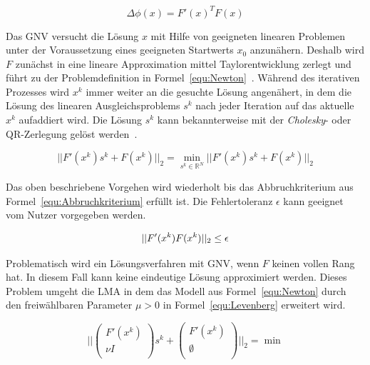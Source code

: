 \begin{equation}
\label{equ:GradPhi}
\Delta\phi(x)=F'(x)^TF(x)
\end{equation}

Das GNV versucht die Lösung $x$ mit Hilfe von geeigneten linearen Problemen unter der Voraussetzung eines geeigneten Startwerts $x_0$ anzunähern. Deshalb wird $F$ zunächst in eine lineare Approximation mittel Taylorentwicklung zerlegt und führt zu der Problemdefinition in Formel~\ref{equ:Newton}~\cite{LevMarquardt}. Während des iterativen Prozesses wird $x^k$ immer weiter an die gesuchte Lösung angenähert, in dem die Lösung des linearen Ausgleichsproblems $s^k$ nach jeder Iteration auf das aktuelle $x^k$ aufaddiert wird. Die Lösung $s^k$ kann bekannterweise mit der \textit{Cholesky}- oder QR-Zerlegung gelöst werden~\cite{schwarz2011numerische}.

\begin{equation}
\label{equ:Newton}
||F'(x^k)s^k+F(x^k)||_2 = \min_{s^k \in \mathbb{R}^N}||F'(x^k)s^k+F(x^k)||_2
\end{equation}

Das oben beschriebene Vorgehen wird wiederholt bis das Abbruchkriterium aus Formel~\ref{equ:Abbruchkriterium} erfüllt ist. Die Fehlertoleranz $\epsilon$ kann geeignet vom Nutzer vorgegeben werden.

\begin{equation}
\label{equ:Abbruchkriterium}
||F'(x^k)F(x^k)||_2 \leq \epsilon\\
\end{equation}

Problematisch wird ein Lösungsverfahren mit GNV, wenn $F$ keinen vollen Rang hat. In diesem Fall kann keine eindeutige Lösung approximiert werden. Dieses Problem umgeht die LMA in dem das Modell aus Formel~\ref{equ:Newton} durch den freiwählbaren Parameter $\mu>0$ in Formel~\ref{equ:Levenberg} erweitert wird. 

\begin{equation}
\label{equ:Levenberg}
||
\begin{pmatrix}
F'(x^k)\\\nu I\\
\end{pmatrix}
s^k+\begin{pmatrix}
F'(x^k)\\\emptyset\\
\end{pmatrix}||_2 = \min
\end{equation}

